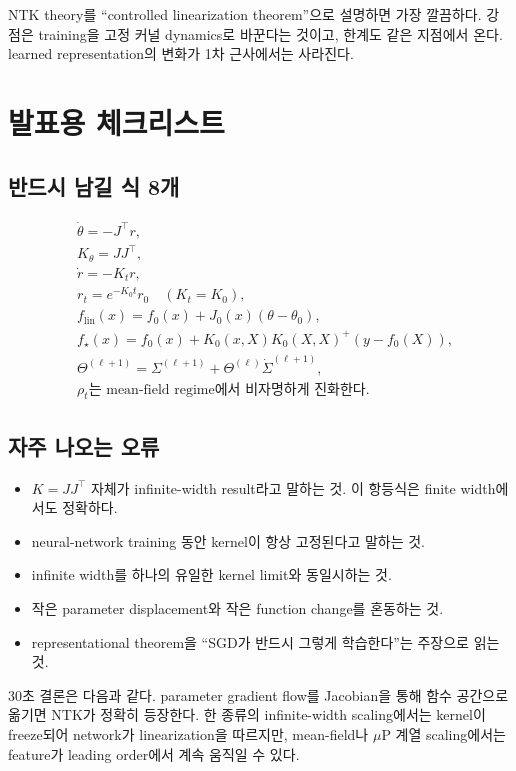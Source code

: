 \documentclass[11pt,a4paper,oneside,openany]{memoir}
\theoremstyle{definition}
\begin{document}
\begin{presentbox}
NTK theory를 ``controlled linearization theorem''으로 설명하면 가장 깔끔하다. 강점은 training을 고정 커널 dynamics로 바꾼다는 것이고, 한계도 같은 지점에서 온다. learned representation의 변화가 1차 근사에서는 사라진다.
\end{presentbox}

\chapter{발표용 체크리스트}
\section{반드시 남길 식 8개}
\begin{align*}
&\dot\theta=-J^\top r,\\
&K_\theta=JJ^\top,\\
&\dot r=-K_t r,\\
&r_t=e^{-K_0t}r_0\quad(K_t=K_0),\\
&f_{\mathrm{lin}}(x)=f_0(x)+J_0(x)(\theta-\theta_0),\\
&f_\star(x)=f_0(x)+K_0(x,X)K_0(X,X)^+(y-f_0(X)),\\
&\Theta^{(\ell+1)}=\Sigma^{(\ell+1)}+\Theta^{(\ell)}\dot\Sigma^{(\ell+1)},\\
&\rho_t\text{는 mean-field regime에서 비자명하게 진화한다.}
\end{align*}

\section{자주 나오는 오류}
\begin{itemize}
\item $K=JJ^\top$ 자체가 infinite-width result라고 말하는 것. 이 항등식은 finite width에서도 정확하다.
\item neural-network training 동안 kernel이 항상 고정된다고 말하는 것.
\item infinite width를 하나의 유일한 kernel limit와 동일시하는 것.
\item 작은 parameter displacement와 작은 function change를 혼동하는 것.
\item representational theorem을 ``SGD가 반드시 그렇게 학습한다''는 주장으로 읽는 것.
\end{itemize}

\begin{presentbox}
30초 결론은 다음과 같다. parameter gradient flow를 Jacobian을 통해 함수 공간으로 옮기면 NTK가 정확히 등장한다. 한 종류의 infinite-width scaling에서는 kernel이 freeze되어 network가 linearization을 따르지만, mean-field나 $\mu$P 계열 scaling에서는 feature가 leading order에서 계속 움직일 수 있다.
\end{presentbox}
\end{document}
